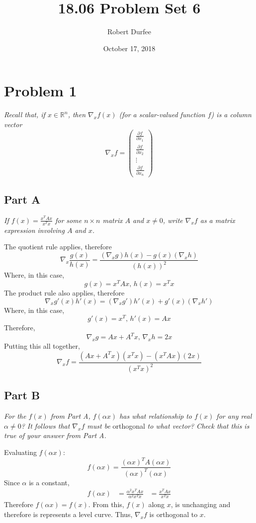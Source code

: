 \documentclass{article}
\title{18.06 Problem Set 6}
\author{Robert Durfee}
\date{October 17, 2018}
\begin{document}
\maketitle

\section*{Problem 1}

\textit{Recall that, if $x \in \mathbb{R}^n$, then $\nabla_x f(x)$ (for a
scalar-valued function $f$) is a column vector}
$$ \nabla_x f = \begin{pmatrix}
    \frac{\partial f}{\partial x_1} \\
    \frac{\partial f}{\partial x_2} \\
    \vdots \\
    \frac{\partial f}{\partial x_n}
\end{pmatrix} $$

\subsection*{Part A}

\textit{If $f(x) = \frac{x^T A x}{x^T x}$ for some $n \times n$ matrix $A$
and $x \neq 0$, write $\nabla_x f$ as a matrix expression involving $A$ and
$x$.}

\bigbreak

The quotient rule applies, therefore
$$ \nabla_x \frac{g(x)}{h(x)} = \frac{(\nabla_x g) h(x) - g(x) (\nabla_x
h)}{(h(x))^2} $$
Where, in this case,
$$ g(x) = x^T A x,\, h(x) = x^T x $$
The product rule also applies, therefore
$$ \nabla_x g'(x) h'(x) = (\nabla_x g') h'(x) + g'(x) (\nabla_x h') $$
Where, in this case,
$$ g'(x) = x^T,\, h'(x) = Ax $$
Therefore,
$$ \nabla_x g = Ax + A^T x,\, \nabla_x h = 2x $$
Putting this all together,
$$ \nabla_x f = \frac{(Ax + A^T x) (x^T x) - (x^T A x)(2x)}{(x^T x)^2} $$

\subsection*{Part B}

\textit{For the $f(x)$ from Part A, $f(\alpha x)$ has what relationship to
$f(x)$ for any real $\alpha \neq 0$? It follows that $\nabla_x f$ must be}
orthogonal \textit{to what vector? Check that this is true of your answer
from Part A.}

\bigbreak

Evaluating $f(\alpha x)$:
$$ f(\alpha x) = \frac{(\alpha x)^T A (\alpha x)}{(\alpha x)^T (\alpha x)} $$
Since $\alpha$ is a constant,
\begin{align*}
    f(\alpha x) &= \frac{\alpha^2 x^T A x}{\alpha^2 x^T x}
    &= \frac{x^T A x}{x^T x}
\end{align*}
Therefore $f(\alpha x) = f(x)$. From this, $f(x)$ along $x$, is unchanging
and therefore is represents a level curve. Thus, $\nabla_x f$ is orthogonal
to $x$.
\end{document}

